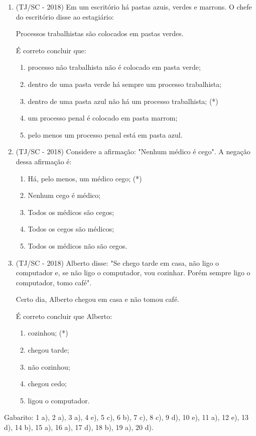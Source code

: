 \begin{enumerate}
  \item (TJ/SC - 2018) Em um escritório há pastas azuis, verdes e marrons. O chefe do escritório disse ao estagiário:
  
  Processos trabalhistas são colocados em pastas verdes.
  
  É correto concluir que:
  \begin{enumerate}
  \item processo não trabalhista não é colocado em pasta verde;
  \item dentro de uma pasta verde há sempre um processo trabalhista;
  \item dentro de uma pasta azul não há um processo trabalhista; (*)
  \item um processo penal é colocado em pasta marrom;
  \item pelo menos um processo penal está em pasta azul.
 \end{enumerate}
 
  \item (TJ/SC - 2018) Considere a afirmação: "Nenhum médico é cego". A negação dessa afirmação é:
  \begin{enumerate}
  \item Há, pelo menos, um médico cego; (*)
  \item Nenhum cego é médico;
  \item Todos os médicos são cegos;
  \item Todos os cegos são médicos;
  \item Todos os médicos não são cegos.
 \end{enumerate}
 
 \item (TJ/SC - 2018) Alberto disse: "Se chego tarde em casa, não ligo o computador e, se não ligo o computador, vou cozinhar. Porém sempre ligo o computador, tomo café".
  
  Certo dia, Alberto chegou em casa e não tomou café.
  
  É correto concluir que Alberto:
  \begin{enumerate}
  \item cozinhou; (*)
  \item chegou tarde;
  \item não cozinhou;
  \item chegou cedo;
  \item ligou o computador.
 \end{enumerate}

\end{enumerate}

Gabarito: 1 a), 2 a), 3 a), 4 e), 5 c), 6 b), 7 c), 8 c), 9 d), 10 e), 11 a), 12 e), 13 d), 14 b), 15 a), 16 a), 17 d), 18 b), 19 a), 20 d).

